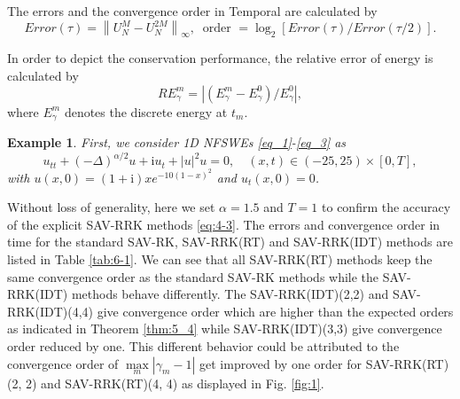 \documentclass[preprint,compress,3p,10pt,fleqn]{elsarticle}
\numberwithin{equation}{section}
\newtheorem{expl}{Example}[section]
\newenvironment{example}{\begin{expl}\rm}{\end{expl}}
\begin{document}
The errors and the convergence order in Temporal are calculated by
\begin{equation}
	Error(\tau)=\left\|U_{N}^{M}-U_{N}^{2 M}\right\|_{\infty},~\text { order }=\log _{2}[Error(\tau) / Error(\tau / 2)].\label{eq_104}
\end{equation}

In order to depict the conservation performance, the relative error of energy is calculated by
\begin{equation}\label{eq_105}
R E_{\gamma}^{m}=\left|\left(E_{\gamma}^{m}-E_{\gamma}^{0}\right) / E_{\gamma}^{0}\right|,
\end{equation}
where $E_{\gamma}^{m}$ denotes the discrete energy at $t_m$.

\begin{example}\label{ex:1}
\cite{ranLinearlyImplicitConservative2016} First, we consider 1D NFSWEs \eqref{eq_1}-\eqref{eq_3} as
\begin{equation}\label{eq_108}
u_{t t}+(-\Delta)^{\alpha / 2} u+\mathrm{i}u_t+|u|^2 u=0, \quad (x,t)\in  (-25, 25)\times[0, T],
\end{equation}
with $u(x, 0)=(1+\mathrm{i}) x e^{-10(1-x)^2}$ and $u_t(x, 0)=0$.
\end{example}
	

	
Without loss of generality, here we set $\alpha=1.5$ and $T=1$ to confirm the accuracy of the explicit SAV-RRK methods \eqref{eq:4-3}.
The errors and convergence order in time for the standard SAV-RK, SAV-RRK(RT) and SAV-RRK(IDT) methods are listed in Table \ref{tab:6-1}.
We can see that all SAV-RRK(RT) methods keep the same convergence order as the standard SAV-RK methods while the SAV-RRK(IDT) methods behave differently.
The SAV-RRK(IDT)(2,2) and SAV-RRK(IDT)(4,4) give convergence order  which are higher than the expected orders as indicated in Theorem \ref{thm:5_4} while SAV-RRK(IDT)(3,3) give convergence order reduced by one. This different behavior could be attributed to the convergence order of $\max\limits _m\left|\gamma_m-1\right|$ get improved by one order for SAV-RRK(RT)(2, 2) and SAV-RRK(RT)(4, 4) as displayed in Fig. \ref{fig:1}.
\end{document}
